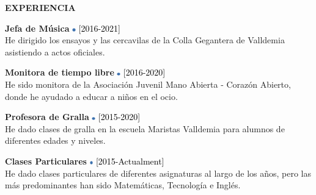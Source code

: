 \documentclass[../main.tex]{subfiles}
\begin{document}
    \vspace*{0.5cm}
    \textbf{\textcolor{myCV2}{EXPERIENCIA\underline{\hspace{7.1cm}}}}
        \vspace*{0.3cm}
        
        \textbf{Jefa de Música}
        \includegraphics[width=0.15cm]{assets/blue.png} 
        \textcolor{black}{[2016-2021]}\\
        He dirigido los ensayos y las cercavilas de la Colla Gegantera de Valldemia asistiendo a actos oficiales.
        
        \vspace*{0.25cm}
        \textbf{Monitora de tiempo libre}
        \includegraphics[width=0.15cm]{assets/blue.png}
        \textcolor{black}{[2016-2020]}\\
        He sido monitora de la Asociación Juvenil Mano Abierta - Corazón Abierto, donde he ayudado a educar a niños en el ocio.
        
        \vspace*{0.25cm}
        \textbf{Profesora de Gralla}
        \includegraphics[width=0.15cm]{assets/blue.png}
        \textcolor{black}{[2015-2020]} \\
        He dado clases de gralla en la escuela Maristas Valldemia para alumnos de diferentes edades y niveles.
        
        \vspace*{0.25cm}
        \textbf{Clases Particulares}
        \includegraphics[width=0.15cm]{assets/blue.png}
        \textcolor{black}{[2015-Actualment]} \\
        He dado clases particulares de diferentes asignaturas al largo de los años, pero las más predominantes han sido Matemáticas, Tecnología e Inglés.
\end{document}
